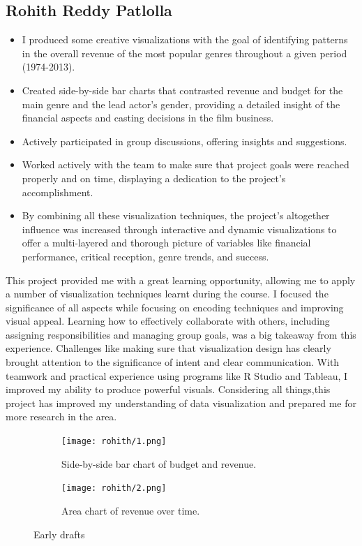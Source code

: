 \documentclass[12pt]{article}
\begin{document}
\subsection{Rohith Reddy Patlolla}
\begin{itemize}
    \item  I produced some creative visualizations with the goal of identifying patterns in the overall revenue of the most popular genres throughout a given period (1974-2013).
    \item Created side-by-side bar charts that contrasted revenue and budget for the main genre and the lead actor's gender, providing a detailed insight of the financial aspects and casting decisions in the film business.
    \item Actively participated in group discussions, offering insights and suggestions.
    \item Worked actively with the team to make sure that project goals were reached properly and on time, displaying a dedication to the project's accomplishment.
    \item By combining all these visualization techniques, the project's altogether influence was increased through interactive and dynamic visualizations to offer a multi-layered and thorough picture of variables like financial performance, critical reception, genre trends, and success.
\end{itemize}

This project provided me with a great learning opportunity, allowing me to apply a number of visualization techniques learnt during the course. I focused the significance of all aspects while focusing on encoding techniques and improving visual appeal. Learning how to effectively collaborate with others, including assigning responsibilities and managing group goals, was a big takeaway from this experience. Challenges like making sure that visualization design has clearly brought attention to the significance of intent and clear communication. With teamwork and practical experience using programs like R Studio and Tableau, I improved my ability to produce powerful visuals. Considering all things,this project has improved my understanding of data visualization and prepared me for more research in the area.

\begin{figure}[H]
\centering

\begin{subfigure}[b]{0.45\textwidth}
\centering
\texttt{[image: rohith/1.png]}
\label{fig:sub1}
\caption{Side-by-side bar chart of budget and revenue.}
\end{subfigure}
\hfill
\begin{subfigure}[b]{0.45\textwidth}
\centering
\texttt{[image: rohith/2.png]}
\label{fig:sub1}
\caption{Area chart of revenue over time.}
\end{subfigure}
\caption{Early drafts}
        \label{fig:test}
\end{figure}
\end{document}
